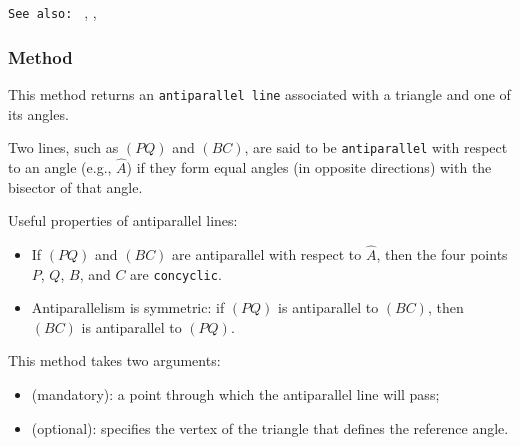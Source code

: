 \begin{tkzexample}[latex=.55\textwidth]
\begin{center}
\end{center}
\end{tkzexample}


\texttt{See also: } , , 

\subsubsection{Method }
\label{antiparallel}

This method returns an \texttt{antiparallel line} associated with a triangle and one of its angles.

Two lines, such as $(PQ)$ and $(BC)$, are said to be \texttt{antiparallel} with respect to an angle (e.g., $\hat{A}$) if they form equal angles (in opposite directions) with the bisector of that angle.


Useful properties of antiparallel lines:
\begin{itemize}
  \item If $(PQ)$ and $(BC)$ are antiparallel with respect to $\hat{A}$, then the four points $P$, $Q$, $B$, and $C$ are \texttt{concyclic}.
  \item Antiparallelism is symmetric: if $(PQ)$ is antiparallel to $(BC)$, then $(BC)$ is antiparallel to $(PQ)$.
\end{itemize}

\medskip

This method takes two arguments:
\begin{itemize}
  \item {} (mandatory): a point through which the antiparallel line will pass;
  \item {} (optional): specifies the vertex of the triangle that defines the reference angle.
\end{itemize}


